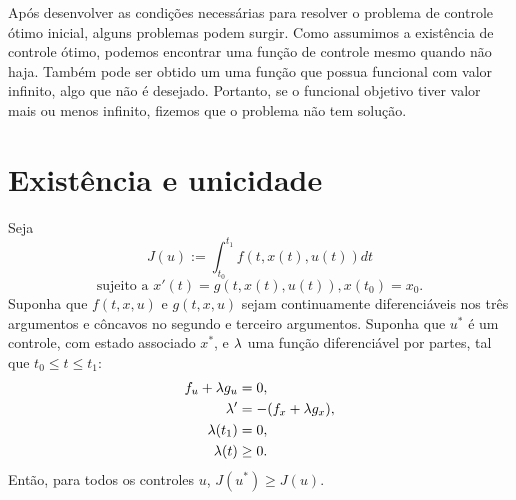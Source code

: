 Após desenvolver as condições necessárias para resolver o problema de controle
ótimo inicial, alguns problemas podem surgir. Como assumimos a existência de
controle ótimo, podemos encontrar uma função de controle mesmo quando não
haja. Também pode ser obtido um uma função que possua funcional com valor
infinito, algo que não é desejado. Portanto, se o funcional objetivo tiver
valor mais ou menos infinito, fizemos que o problema não tem solução. 

\section{Existência e unicidade}

\begin{theorem}
    Seja $$J(u) := \int_{t_0}^{t_1} f(t,x(t),u(t))dt$$ 
    $$\text{sujeito a } x'(t) = g(t,x(t),u(t)), x(t_0) = x_0.$$ 
    Suponha que $f(t,x,u)$ e $g(t,x,u)$ sejam continuamente diferenciáveis nos
    três argumentos e côncavos no segundo e terceiro argumentos. Suponha que
    $u^*$ é um controle, com estado associado $x^*$, e $\lambda$ uma função
    diferenciável por partes, tal que $t_0 \le t \le t_1$: 
    \begin{subequations}
        \label{eq:conditions}
        \begin{align}
            f_u + \lambda g_u &= 0, \label{rel1} \\
            \lambda ' &= - (f_x + \lambda g_x),  \label{rel2} \\ 
            \lambda(t_1) &= 0, \label{rel3} \\
            \lambda(t) &\ge 0. \label{rel4}
        \end{align}
    \end{subequations}
    Então, para todos os controles $u$, $J(u^*) \ge J(u)$. 
\end{theorem}

